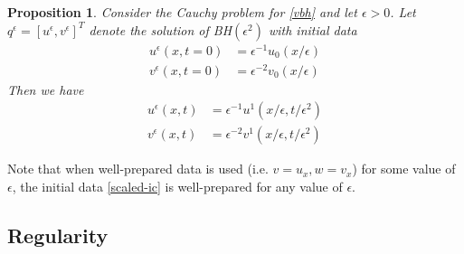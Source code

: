 \documentclass{article}
\theoremstyle{plain}
\newtheorem{proposition}[theorem]{Proposition}
\theoremstyle{definition}
\numberwithin{theorem}{section}
\begin{document}
\begin{proposition}\label{prop:vbh-scaling}
Consider the Cauchy problem for \eqref{vbh} and let $\epsilon>0$.
Let $q^\epsilon=[u^\epsilon,v^\epsilon]^T$ denote the
solution of BH$(\epsilon^2)$ with initial data
\begin{subequations} \label{bh-scaled-ic}
\begin{align}
    u^\epsilon(x,t=0) & = \epsilon^{-1} u_0(x/\epsilon) \\
    v^\epsilon(x,t=0) & = \epsilon^{-2} v_0(x/\epsilon)
\end{align}
\end{subequations}
Then we have
\begin{subequations} \label{bh-scaled-ic-2}
\begin{align}
    u^{\epsilon}(x,t) & = \epsilon^{-1} u^1(x/\epsilon, t/\epsilon^2) \\
    v^{\epsilon}(x,t) & = \epsilon^{-2} v^1(x/\epsilon, t/\epsilon^2)
\end{align}
\end{subequations}
\end{proposition}
Note that when well-prepared data is used (i.e. $v=u_x, w = v_x$) for some value of
$\epsilon$, the initial data \eqref{scaled-ic} is well-prepared for any value of $\epsilon$.


\subsection{Regularity}
\end{document}
